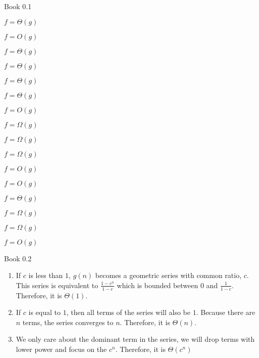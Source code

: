 \documentclass[boxes]{rutgers_hw}
\author{Rohan Karamel} %
\date{\today} %
\begin{document}
\maketitle



\begin{exern}{1} %
  Book 0.1
\end{exern}
\begin{solution} %
  \hfill
  \begin{enumerate} 
    \begin{multicols}{2}
    
      \item $f = \Theta(g)$
      \item $f = O(g)$
      \item $f = \Theta(g)$
      \item $f = \Theta(g)$
      \item $f = \Theta(g)$
      \item $f = \Theta(g)$
      \item $f = O(g)$
      \item $f = \Omega(g)$
      \item $f = \Omega(g)$
      \item $f = \Omega(g)$
      \item $f = O(g)$
      \item $f = O(g)$
      \item $f = \Theta(g)$
      \item $f = \Omega(g)$
      \item $f = \Omega(g)$
      \item $f = O(g)$
      
    \end{multicols}
  \end{enumerate}
\end{solution}

\begin{exern}{2}
  Book 0.2
\end{exern}
\begin{solution}
    \hfill
    \begin{enumerate}
        \item If $c$ is less than $1$, $g(n)$ becomes a geometric series with common ratio, $c$. This series is equivalent to $\frac{1-c^n}{1-c}$ which is bounded between $0$ and $\frac{1}{1-c}$. Therefore, it is $\Theta(1)$.
        \item If $c$ is equal to $1$, then all terms of the series will also be $1$. Because there are $n$ terms, the series converges to $n$. Therefore, it is $\Theta(n)$.
        \item We only care about the  dominant term in the series, we will drop terms with lower power and focus on the $c^n$. Therefore, it is $\Theta(c^n)$
    \end{enumerate}
\end{solution} 
\end{document}
